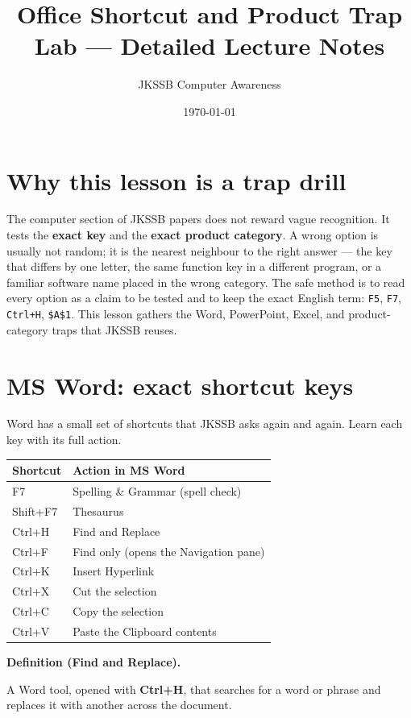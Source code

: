 \documentclass[11pt]{article}
\title{Office Shortcut and Product Trap Lab --- Detailed Lecture Notes}
\author{JKSSB Computer Awareness}
\date{\today}
\newenvironment{definitionbox}[1]{%
  \par\noindent\textbf{Definition (#1).}\ \itshape
}{\par\vspace{0.3em}}
\begin{document}
\maketitle

\section{Why this lesson is a trap drill}
The computer section of JKSSB papers does not reward vague recognition. It
tests the \textbf{exact key} and the \textbf{exact product category}. A wrong
option is usually not random; it is the nearest neighbour to the right answer
--- the key that differs by one letter, the same function key in a different
program, or a familiar software name placed in the wrong category. The safe
method is to read every option as a claim to be tested and to keep the exact
English term: \texttt{F5}, \texttt{F7}, \texttt{Ctrl+H}, \texttt{\$A\$1}.
This lesson gathers the Word, PowerPoint, Excel, and product-category traps
that JKSSB reuses.

\section{MS Word: exact shortcut keys}
Word has a small set of shortcuts that JKSSB asks again and again. Learn each
key with its full action.

\begin{center}
\begin{tabular}{p{}p{}}
\toprule
\textbf{Shortcut} & \textbf{Action in MS Word} \\
\midrule
F7 & Spelling \& Grammar (spell check) \\
Shift+F7 & Thesaurus \\
Ctrl+H & Find and Replace \\
Ctrl+F & Find only (opens the Navigation pane) \\
Ctrl+K & Insert Hyperlink \\
Ctrl+X & Cut the selection \\
Ctrl+C & Copy the selection \\
Ctrl+V & Paste the Clipboard contents \\
\bottomrule
\end{tabular}
\end{center}

\begin{definitionbox}{Find and Replace}
A Word tool, opened with \textbf{Ctrl+H}, that searches for a word or phrase
and replaces it with another across the document.
\end{definitionbox}
\end{document}
